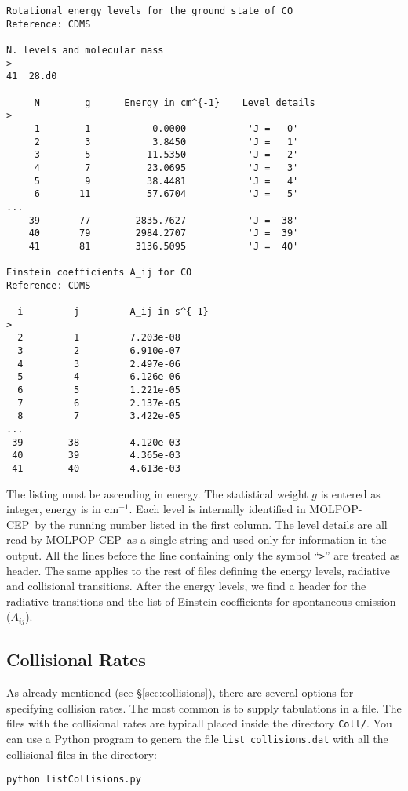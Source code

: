 \documentclass[12pt]{article}
\def\M{MOLPOP-CEP}
\begin{document}
\begin{verbatim}
Rotational energy levels for the ground state of CO
Reference: CDMS

N. levels and molecular mass
>
41  28.d0

     N        g      Energy in cm^{-1}    Level details
>
     1        1           0.0000           'J =   0'
     2        3           3.8450           'J =   1'
     3        5          11.5350           'J =   2'
     4        7          23.0695           'J =   3'
     5        9          38.4481           'J =   4'
     6       11          57.6704           'J =   5'
...
    39       77        2835.7627           'J =  38'
    40       79        2984.2707           'J =  39'
    41       81        3136.5095           'J =  40'

Einstein coefficients A_ij for CO
Reference: CDMS

  i         j         A_ij in s^{-1}
>
  2         1         7.203e-08
  3         2         6.910e-07
  4         3         2.497e-06
  5         4         6.126e-06
  6         5         1.221e-05
  7         6         2.137e-05
  8         7         3.422e-05
...
 39        38         4.120e-03
 40        39         4.365e-03
 41        40         4.613e-03
\end{verbatim}
The listing must be ascending in energy.  The statistical weight $g$ is entered
as integer, energy is in cm$^{-1}$. Each level is internally identified in \M\
by the running number listed in the first column. The level details are all
read by \M\ as a single string and used only for information in the output.
All the lines before the line containing only the symbol ``\texttt{>}'' are
treated as header. The same applies to the rest of files defining the energy
levels, radiative and collisional transitions.
After the energy levels, we find a header for the radiative transitions
and the list of Einstein coefficients for spontaneous emission ($A_{ij}$).


\subsection{Collisional Rates}
As already mentioned (see \S\ref{sec:collisions}), there are several options
for specifying collision rates. The most common is to supply tabulations in a
file. The files with the collisional rates are typicall placed inside the directory 
\texttt{Coll/}. You can use a Python program to genera the file \texttt{list\_collisions.dat}
with all the collisional files in the directory:
\begin{verbatim}
python listCollisions.py
\end{verbatim}
\end{document}
